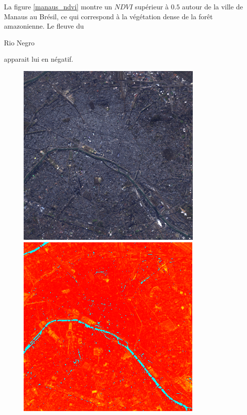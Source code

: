\documentclass{book}
\begin{document}
La figure \ref{manaus_ndvi} montre un $NDVI$ supérieur à $0.5$ autour de la ville de Manaus au Brésil, ce qui correspond à la végétation dense de la for\^et amazonienne. Le fleuve
du \begin{itshape}Rio Negro\end{itshape} apparait lui en négatif.\\

\clearpage

\begin{figure}[H]
\centerline{
\includegraphics[scale=0.45]{../3_ndvi/images/Paris/12_rgb.png}
\includegraphics[scale=0.45]{../3_ndvi/images/Paris/12_ndvi.png}
}
\end{figure}
\end{document}
